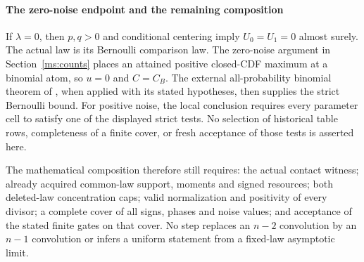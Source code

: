 \paragraph{The zero-noise endpoint and the remaining composition}
\label{ms:fourier:zero-noise}
If $\lambda=0$, then $p,q>0$ and conditional centering imply
$U_0=U_1=0$ almost surely. The actual law is its Bernoulli comparison law.
The zero-noise argument in Section~\ref{ms:counts} places an attained
positive closed-CDF maximum at a binomial atom, so $u=0$ and $C=C_B$.
The external all-probability binomial theorem of
\cite[Theorem~1]{Schulz2016}, when applied with its stated hypotheses,
then supplies the strict Bernoulli bound. For positive noise, the local
conclusion requires every parameter cell to satisfy one of the displayed
strict tests. No selection of historical table rows, completeness of a
finite cover, or fresh acceptance of those tests is asserted here.

The mathematical composition therefore still requires: the actual contact
witness; already acquired common-law support, moments and signed resources;
both deleted-law concentration caps; valid normalization and positivity
of every divisor; a complete cover of all signs, phases and noise values;
and acceptance of the stated finite gates on that cover. No step replaces
an $n-2$ convolution by an $n-1$ convolution or infers a uniform statement
from a fixed-law asymptotic limit.
